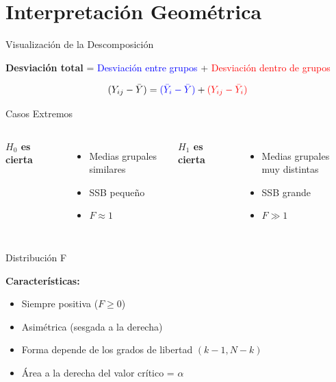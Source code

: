 \documentclass[10pt,aspectratio=169]{beamer}
\begin{document}
\section{Interpretación Geométrica}

\begin{frame}{Visualización de la Descomposición}
\begin{center}
\end{center}

\textbf{Desviación total} = \textcolor{blue}{Desviación entre grupos} + \textcolor{red}{Desviación dentro de grupos}

\vspace{0.3cm}

\begin{equation*}
(Y_{ij} - \bar{Y}) = \textcolor{blue}{(\bar{Y}_i - \bar{Y})} + \textcolor{red}{(Y_{ij} - \bar{Y}_i)}
\end{equation*}
\end{frame}

\begin{frame}{Casos Extremos}
\begin{columns}[T]
\textbf{$H_0$ es cierta}
\begin{center}
\end{center}
\begin{itemize}
    \item Medias grupales similares
    \item SSB pequeño
    \item $F \approx 1$
\end{itemize}

\textbf{$H_1$ es cierta}
\begin{center}
\end{center}
\begin{itemize}
    \item Medias grupales muy distintas
    \item SSB grande
    \item $F \gg 1$
\end{itemize}
\end{columns}
\end{frame}

\begin{frame}{Distribución F}
\begin{center}
\end{center}

\textbf{Características:}
\begin{itemize}
    \item Siempre positiva ($F \geq 0$)
    \item Asimétrica (sesgada a la derecha)
    \item Forma depende de los grados de libertad $(k-1, N-k)$
    \item Área a la derecha del valor crítico = $\alpha$
\end{itemize}
\end{frame}
\end{document}
